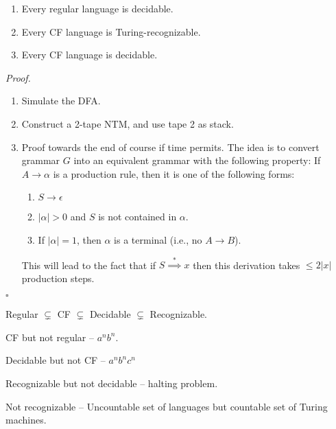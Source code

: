 \documentclass[a4paper]{article}
\newenvironment{proof}{\begin{breakbox}\textit{Proof.}}{\hfill$\square$\end{breakbox}}
\newcommand{\nl}{\vspace{0.2cm}\\}
\newcommand{\derives}{\stackrel{*}{\implies}}
\begin{document}
\begin{claim}
    \begin{enumerate}
        \item Every regular language is decidable.
        \item Every CF language is Turing-recognizable.
        \item Every CF language is decidable.
    \end{enumerate}
\end{claim}

\begin{proof}
    \begin{enumerate}
        \item Simulate the DFA.
        \item Construct a 2-tape NTM, and use tape 2 as stack.
        \item Proof towards the end of course if time permits. The idea is to convert grammar $G$ into an equivalent grammar with the following property: If $A \to \alpha$ is a production
            rule, then it is one of the following forms:
            \begin{enumerate}
                \item $S \to \epsilon$
                \item $|\alpha| > 0$ and $S$ is not contained in $\alpha$.
                \item If $|\alpha| = 1$, then $\alpha$ is a terminal (i.e., no $A \to B$).
            \end{enumerate}
            This will lead to the fact that if $S \derives x$ then this derivation takes $\le 2|x|$ production steps.
    \end{enumerate}
\end{proof}

Regular $\subsetneq$ CF $\subsetneq$ Decidable $\subsetneq$ Recognizable.

CF but not regular -- $a^nb^n$.

Decidable but not CF -- $a^nb^nc^n$

Recognizable but not decidable -- halting problem.

Not recognizable -- Uncountable set of languages but countable set of Turing machines.\nl
\end{document}
